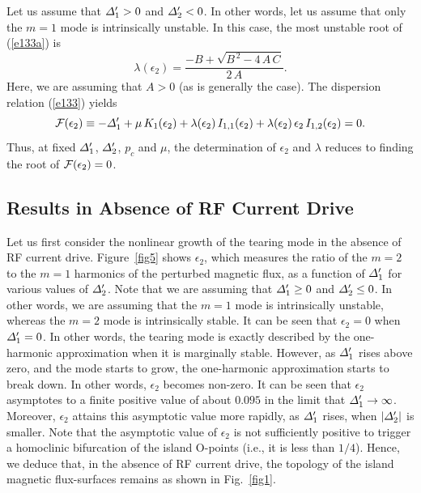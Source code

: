 \documentclass[12pt,prb,aps]{revtex4-1}
\begin{document}
Let us assume that ${\mit\Delta}_1'>0$ and ${\mit\Delta}_2'< 0$. In other words, let us assume that only the
$m=1$ mode is intrinsically unstable. In this case, the most unstable root of (\ref{e133a}) is
\begin{equation}
\lambda(\epsilon_2) = \frac{-B +\sqrt{B^{\,2}-4\,A\,C}}{2\,A}.
\end{equation}
Here, we are assuming that $A>0$ (as is generally the case). The dispersion relation (\ref{e133})  yields
\begin{equation}
{\cal F}(\epsilon_2)\equiv -{\mit\Delta}_1'+\mu\,K_1(\epsilon_2)+\lambda(\epsilon_2)\,I_{1,1}(\epsilon_2)+\lambda(\epsilon_2)\,\epsilon_2\,I_{1,2}(\epsilon_2) = 0.
\end{equation}
Thus, at fixed ${\mit\Delta}_1'$, ${\mit\Delta}_2'$, $p_c$ and $\mu$, the determination of $\epsilon_2$ and $\lambda$ reduces to finding the root of ${\cal F}(\epsilon_2)=0$. 

\subsection{Results in Absence of RF Current Drive}
Let us first consider the nonlinear growth of the tearing mode in the absence of RF current drive. Figure~\ref{fig5}
shows $\epsilon_2$, which measures the ratio of the $m=2$ to the $m=1$ harmonics of the perturbed magnetic flux,  as a function of ${\mit\Delta}_1'$ for various values of
${\mit\Delta}_2'$. Note that we are assuming that ${\mit\Delta}_1'\geq 0$ and ${\mit\Delta}_2'\leq 0$. In other words, we are assuming  that
the $m=1$ mode is intrinsically unstable, whereas the $m=2$ mode is intrinsically stable. It can be seen that $\epsilon_2=0$
when ${\mit\Delta}_1'=0$. In other words, the tearing mode is exactly described by the one-harmonic approximation
when it is marginally stable. However, as ${\mit\Delta}_1'$ rises above zero, and the mode starts to grow, the one-harmonic approximation starts to break down. In other words, $\epsilon_2$ becomes non-zero. It can be seen that $\epsilon_2$ asymptotes to a finite positive value of about $0.095$ in the limit that 
${\mit\Delta}_1'\rightarrow \infty$. Moreover, $\epsilon_2$ attains this asymptotic value more rapidly, as ${\mit\Delta}_1'$ rises, 
when $|{\mit\Delta}_2'|$ is smaller. 
Note that the asymptotic value of $\epsilon_2$ is not 
sufficiently positive  to trigger a homoclinic bifurcation of the island O-points (i.e., it is less than $1/4$). Hence, we deduce that, in the absence of RF current drive,  the topology of the island
magnetic flux-surfaces remains as shown in Fig.~\ref{fig1}. 
\end{document}
